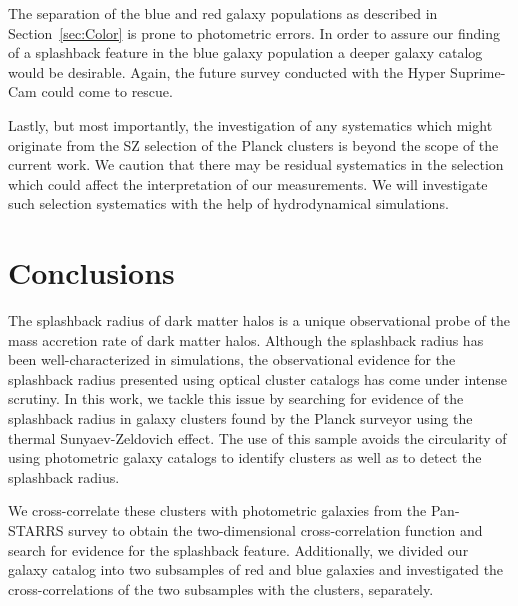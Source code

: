 \documentclass[iop, apjl, twocolappendix, numberedappendix]{emulateapj}
\begin{document}
The separation of the blue and red galaxy populations as described in 
Section~\ref{sec:Color} is prone to photometric errors. In order to 
assure our finding of a splashback feature in the blue galaxy population
a deeper galaxy catalog would be desirable. Again, the future survey
conducted with the Hyper Suprime-Cam could come to rescue.

Lastly, but most importantly, the investigation of any systematics
which might originate from the SZ selection of the Planck clusters
is beyond the scope of the current work. We caution that there may
be residual systematics in the selection which could affect the
interpretation of our measurements. We will investigate such
selection systematics with the help of hydrodynamical simulations.

\section{Conclusions}
\label{sec:Conclusions}
The splashback radius of dark matter halos is a unique observational
probe of the mass accretion rate of dark matter halos. Although the
splashback radius has been well-characterized in simulations, the
observational evidence for the splashback radius presented using
optical cluster catalogs has come under intense scrutiny. In this
work, we tackle this issue by searching for evidence of the
splashback radius in galaxy clusters found by the Planck surveyor using
the thermal Sunyaev-Zeldovich effect. The use of this sample avoids
the circularity of using photometric galaxy catalogs to identify
clusters as well as to detect the splashback radius. 

We cross-correlate these clusters with photometric galaxies from the
Pan-STARRS survey to obtain the two-dimensional cross-correlation
function and search for evidence for the splashback feature.
Additionally, we divided our galaxy catalog into two subsamples of
red and blue galaxies and investigated the cross-correlations of the
two subsamples with the clusters, separately.
\end{document}
